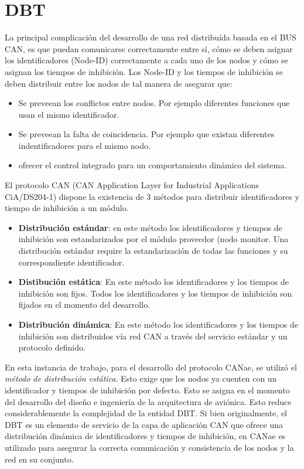 \section{DBT}\label{Appendix:DBT}
La principal complicación del desarrollo de una red distribuída basada en el BUS
CAN, es que puedan comunicarse correctamente entre sí, cómo se deben asignar
los identificadores (Node-ID) correctamente a cada uno de los nodos y cómo se
asignan los tiempos de inhibición. Los Node-ID y los tiempos de inhibición se
deben distribuir entre los nodos de tal manera de asegurar que:
\begin{itemize}
\item Se preveean los conflictos entre nodos. Por ejemplo diferentes funciones
  que usan el mismo identificador.
\item Se preveean la falta de coincidencia. Por ejemplo que existan diferentes
  indentificadores para el mismo nodo.
\item ofrecer el control integrado para un comportamiento dinámico del
  sistema.  
\end{itemize}

El protocolo CAN (CAN Application Layer for Industrial Applications
CiA/DS204-1) dispone la existencia de 3 métodos para distribuir identificadores
y tiempo de inhibición a un módulo.

\begin{itemize}
\item \textbf{Distribución estándar}: en este método los identificadores y
  tiempos de inhibición son estandarizados por el módulo proveedor (nodo
  monitor. Una distribución estándar require la estandarización de todas las
  funciones y su correspondiente identificador.
\item \textbf{Distibución estática}: En este método los identificadores y los
  tiempos de inhibición son fijos. Todos los identificadores y los tiempos de
  inhibición son fijados en el momento del desarrollo.
\item \textbf{Distribución dinámica}: En este método los identificadores y los
  tiempos de inhibición son distribuidos vía red CAN a través del servicio
  estándar y un protocolo definido.  
\end{itemize}

En esta instancia de trabajo, para el desarrollo del protocolo CANae, se utilizó
el \textit{método de distribución estática}. Esto exige que los nodos ya cuenten
con un identificador y tiempos de inhibición por defecto. Esto se asigna en el
momento del desarrollo del diseño e ingeniería de la arquitectura de aviónica.
Esto reduce considerablemente la complejidad de la entidad DBT. Si bien
originalmente, el DBT es un elemento de servicio de la capa de aplicación CAN
que ofrece una distribución dinámica de identificadores y tiempos de inhibición,
en CANae es utilizado para asegurar la correcta comunicación y consistencia de
los nodos y la red en su conjunto.

